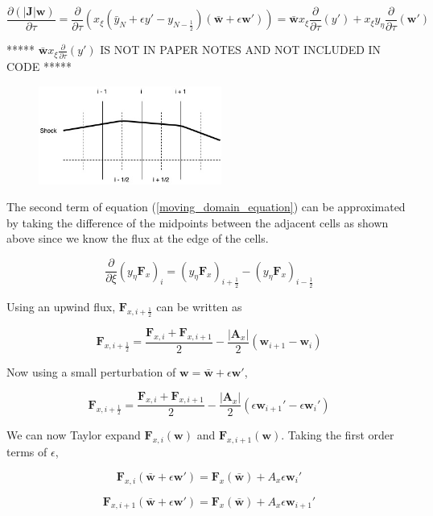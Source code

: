 \documentclass[10pt]{article}
\begin{document}
	$$ \frac{\partial (|\mathbf{J}| \mathbf{w})}{\partial \tau} = \frac{\partial}{\partial \tau} (x_\xi (\bar{y}_N + \epsilon y' - y_{N-\frac{1}{2}}) (\bar{\mathbf{w}} + \epsilon \mathbf{w}')) = \bar{\mathbf{w}} x_\xi \frac{\partial}{\partial \tau}(y') + x_\xi y_\eta \frac{\partial}{\partial \tau} (\mathbf{w}') $$
	
	***** $\bar{\mathbf{w}} x_\xi \frac{\partial}{\partial \tau}(y')$ IS NOT IN PAPER NOTES AND NOT INCLUDED IN CODE *****
	
	\begin{figure}[h]
		\includegraphics[width=6cm]{shock_point_x}
		\centering
	\end{figure}
	
	The second term of equation (\ref{moving_domain_equation}) can be approximated by taking the difference of the midpoints between the adjacent cells as shown above since we know the flux at the edge of the cells.
	
	$$ \frac{\partial}{\partial \xi} (y_\eta \mathbf{F}_x)_i =  (y_\eta \mathbf{F}_x)_{i+\frac{1}{2}} - (y_\eta \mathbf{F}_x)_{i-\frac{1}{2}} $$
	
	Using an upwind flux, $\mathbf{F}_{x,i+\frac{1}{2}}$ can be written as
	
	$$ \mathbf{F}_{x,i+\frac{1}{2}} = \frac{\mathbf{F}_{x,i} + \mathbf{F}_{x,i+1}}{2} - \frac{|\mathbf{A}_x|}{2}(\mathbf{w}_{i+1} - \mathbf{w}_{i})$$
	
	Now using a small perturbation of $\mathbf{w} = \bar{\mathbf{w}} + \epsilon \mathbf{w}'$, 
	
	$$ \mathbf{F}_{x,i+\frac{1}{2}} = \frac{\mathbf{F}_{x,i} + \mathbf{F}_{x,i+1}}{2} - \frac{|\mathbf{A}_x|}{2} (\epsilon \mathbf{w}_{i+1}' - \epsilon \mathbf{w}_i')$$
	
	We can now Taylor expand $\mathbf{F}_{x,i}(\mathbf{w})$ and $\mathbf{F}_{x,i+1}(\mathbf{w})$. Taking the first order terms of $\epsilon$,
	
	$$ \mathbf{F}_{x,i}(\bar{\mathbf{w}} + \epsilon \mathbf{w}') = \mathbf{F}_{x}(\bar{\mathbf{w}}) + A_x \epsilon \mathbf{w}_i' $$
	
	$$ \mathbf{F}_{x,i+1}(\bar{\mathbf{w}} + \epsilon \mathbf{w}') = \mathbf{F}_{x}(\bar{\mathbf{w}}) + A_x \epsilon \mathbf{w}_{i+1}' $$
	
\end{document}
